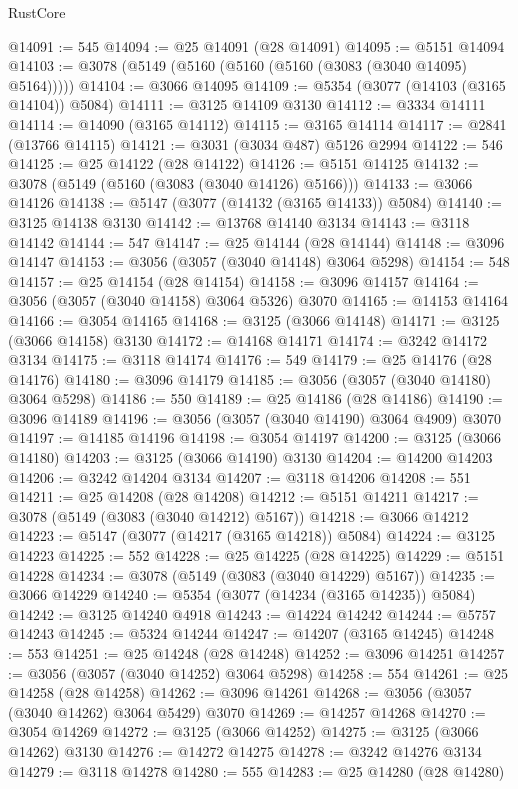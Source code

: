 \begin{lexlean}{RustCore}
\begin{coremodule}
@14091 := 545
@14094 := @25 @14091 (@28 @14091)
@14095 := @5151 @14094
@14103 := @3078 (@5149 (@5160 (@5160 (@5160 (@3083 (@3040 @14095) @5164)))))
@14104 := @3066 @14095
@14109 := @5354 (@3077 (@14103 (@3165 @14104)) @5084)
@14111 := @3125 @14109 @3130
@14112 := @3334 @14111
@14114 := @14090 (@3165 @14112)
@14115 := @3165 @14114
@14117 := @2841 (@13766 @14115)
@14121 := @3031 (@3034 @487) @5126 @2994
@14122 := 546
@14125 := @25 @14122 (@28 @14122)
@14126 := @5151 @14125
@14132 := @3078 (@5149 (@5160 (@3083 (@3040 @14126) @5166)))
@14133 := @3066 @14126
@14138 := @5147 (@3077 (@14132 (@3165 @14133)) @5084)
@14140 := @3125 @14138 @3130
@14142 := @13768 @14140 @3134
@14143 := @3118 @14142
@14144 := 547
@14147 := @25 @14144 (@28 @14144)
@14148 := @3096 @14147
@14153 := @3056 (@3057 (@3040 @14148) @3064 @5298)
@14154 := 548
@14157 := @25 @14154 (@28 @14154)
@14158 := @3096 @14157
@14164 := @3056 (@3057 (@3040 @14158) @3064 @5326) @3070
@14165 := @14153 @14164
@14166 := @3054 @14165
@14168 := @3125 (@3066 @14148)
@14171 := @3125 (@3066 @14158) @3130
@14172 := @14168 @14171
@14174 := @3242 @14172 @3134
@14175 := @3118 @14174
@14176 := 549
@14179 := @25 @14176 (@28 @14176)
@14180 := @3096 @14179
@14185 := @3056 (@3057 (@3040 @14180) @3064 @5298)
@14186 := 550
@14189 := @25 @14186 (@28 @14186)
@14190 := @3096 @14189
@14196 := @3056 (@3057 (@3040 @14190) @3064 @4909) @3070
@14197 := @14185 @14196
@14198 := @3054 @14197
@14200 := @3125 (@3066 @14180)
@14203 := @3125 (@3066 @14190) @3130
@14204 := @14200 @14203
@14206 := @3242 @14204 @3134
@14207 := @3118 @14206
@14208 := 551
@14211 := @25 @14208 (@28 @14208)
@14212 := @5151 @14211
@14217 := @3078 (@5149 (@3083 (@3040 @14212) @5167))
@14218 := @3066 @14212
@14223 := @5147 (@3077 (@14217 (@3165 @14218)) @5084)
@14224 := @3125 @14223
@14225 := 552
@14228 := @25 @14225 (@28 @14225)
@14229 := @5151 @14228
@14234 := @3078 (@5149 (@3083 (@3040 @14229) @5167))
@14235 := @3066 @14229
@14240 := @5354 (@3077 (@14234 (@3165 @14235)) @5084)
@14242 := @3125 @14240 @4918
@14243 := @14224 @14242
@14244 := @5757 @14243
@14245 := @5324 @14244
@14247 := @14207 (@3165 @14245)
@14248 := 553
@14251 := @25 @14248 (@28 @14248)
@14252 := @3096 @14251
@14257 := @3056 (@3057 (@3040 @14252) @3064 @5298)
@14258 := 554
@14261 := @25 @14258 (@28 @14258)
@14262 := @3096 @14261
@14268 := @3056 (@3057 (@3040 @14262) @3064 @5429) @3070
@14269 := @14257 @14268
@14270 := @3054 @14269
@14272 := @3125 (@3066 @14252)
@14275 := @3125 (@3066 @14262) @3130
@14276 := @14272 @14275
@14278 := @3242 @14276 @3134
@14279 := @3118 @14278
@14280 := 555
@14283 := @25 @14280 (@28 @14280)

\end{coremodule}
\end{lexlean}
